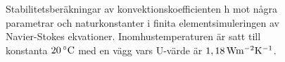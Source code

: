 \begin{figure}[hpbt]
\caption{\label{fig:konv_param}Stabilitetsberäkningar av konvektionskoefficienten h mot några
parametrar och naturkonstanter i finita elementsimuleringen av Navier-Stokes ekvationer.
Inomhustemperaturen är satt till konstanta $\unit[20]{^\circ C}$ med en vägg vars U-värde är
$\unit[1,18]{ Wm^{-2}K^{-1}}$.}

\end{figure}

